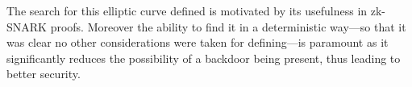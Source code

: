 

The search for this elliptic curve defined is motivated by its usefulness in zk-SNARK proofs.
Moreover the ability to find it in a deterministic way---so
that it was clear no other considerations were taken for defining---is paramount
as it significantly reduces the possibility of a backdoor being present, thus leading to better security.

%
%
%
%
